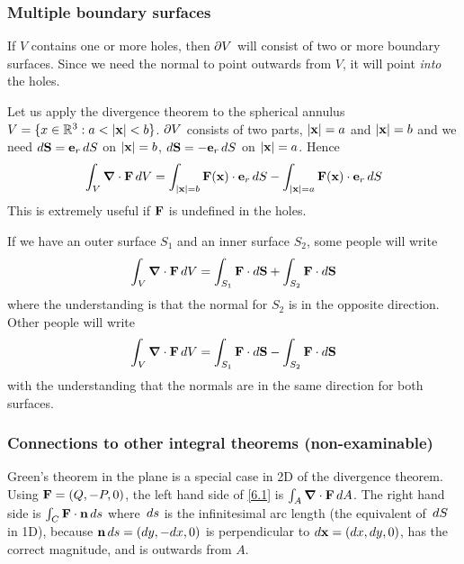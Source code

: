 \documentclass{../../template/note}
\begin{document}
    \subsubsection{Multiple boundary surfaces}

    If \(V\) contains one or more holes, then \(\partial V\) will consist of two or more boundary surfaces. Since we need the normal to point outwards from \(V\), it will point \emph{into} the holes.

    \begin{example*}
        Let us apply the divergence theorem to the spherical annulus \(V = \{x \in \RR^3: a < |\V x| < b\}\). \(\partial V\) consists of two parts, \(|\V x| = a\) and \(|\V x| = b\) and we need \(d\V S = \V e_r \D S\) on \(|\V x| = b\), \(d\V S = -\V e_r \D S\) on \(|\V x| = a\). Hence
        \begin{align*}
            \int_V \div \V F \D V = \int_{|\V x| = b} \V F(\V x) \cdot \V e_r \D S - \int_{|\V x| = a} \V F(\V x) \cdot \V e_r \D S
        \end{align*}
        This is extremely useful if \(\V F\) is undefined in the holes.
    \end{example*}
    
    \begin{remark*}
        If we have an outer surface \(S_1\) and an inner surface \(S_2\), some people will write
        \begin{align*}
            \int_V \div \V F \D V = \int_{S_1} \V F \cdot d\V S + \int_{S_2} \V F \cdot d\V S
        \end{align*}
        where the understanding is that the normal for \(S_2\) is in the opposite direction. Other people will write
        \begin{align*}
            \int_V \div \V F \D V = \int_{S_1} \V F \cdot d\V S - \int_{S_2} \V F \cdot d\V S
        \end{align*}
        with the understanding that the normals are in the same direction for both surfaces.       
    \end{remark*}
    
    \subsubsection{Connections to other integral theorems (non-examinable)}
    
    Green's theorem in the plane is a special case in 2D of the divergence theorem. Using \(\V F = (Q, -P, 0)\), the left hand side of \cref{6.1} is \(\int_A \div \V F \D A\). The right hand side is \(\int_C \V F \cdot \V n \D s\) where \(\,d{s}\) is the infinitesimal arc length (the equivalent of \(\,d{S}\) in 1D), because \(\V n \D s = (dy, -dx, 0)\) is perpendicular to \(d \V x = (dx, dy, 0)\), has the correct magnitude, and is outwards from \(A\).
\end{document}

